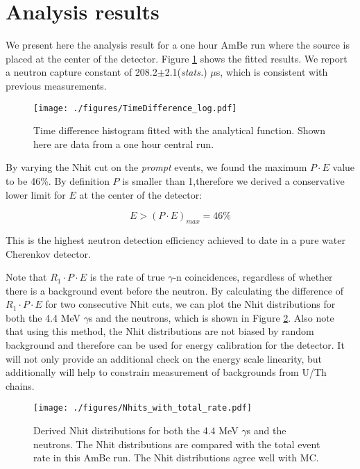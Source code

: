 \documentclass[a4paper]{jpconf}
\begin{document}
\section{Analysis results}

We present here the analysis result for a one hour AmBe run where the source is placed at the center of the detector. Figure \ref{fig:3} shows the fitted results. We report a neutron capture constant of 208.2$\pm$2.1(\textit{stats.}) $\mu$s, which is consistent with previous measurements\cite{Super-Kamiokande:2015xra}\cite{Cokinos:1977zz}.

\begin{figure}[h]
\begin{center}
\texttt{[image: ./figures/TimeDifference\_log.pdf]}
\end{center}
\caption{\label{fig:3}Time difference histogram fitted with the analytical function. Shown here are data from a one hour central run.}
\end{figure}

By varying the Nhit cut on the \textit{prompt} events, we found the maximum $P \cdot E$ value to be 46\%. By definition $P$ is smaller than 1,therefore we derived a conservative lower limit for $E$ at the center of the detector:

\begin{equation}
E > (P \cdot E)_{max} = 46\%
\end{equation}

This is the highest neutron detection efficiency achieved to date in a pure water Cherenkov detector.

Note that $R_1 \cdot P \cdot E$ is the rate of true $\gamma$-n coincidences, regardless of whether there is a background event before the neutron. By calculating the difference of $R_1 \cdot P \cdot E$ for two consecutive Nhit cuts, we can plot the Nhit distributions for both the 4.4 MeV $\gamma$s and the neutrons, which is shown in Figure \ref{fig:4}. Also note that using this method, the Nhit distributions are not biased by random background and therefore can be used for energy calibration for the detector. It will not only provide an additional check on the energy scale linearity, but additionally will help to constrain measurement of backgrounds from U/Th chains. 

\begin{figure}[h]
\begin{center}
\texttt{[image: ./figures/Nhits\_with\_total\_rate.pdf]}
\end{center}
\caption{\label{fig:4}Derived Nhit distributions for both the 4.4 MeV $\gamma$s and the neutrons. The Nhit distributions are compared with the total event rate in this AmBe run. The Nhit distributions agree well with MC.}
\end{figure}
\end{document}

